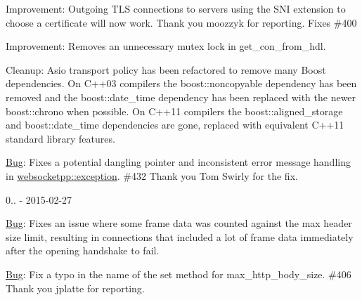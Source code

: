 \begin{DoxyItemize}
\item Improvement\+: Outgoing T\+LS connections to servers using the S\+NI extension to choose a certificate will now work. Thank you moozzyk for reporting. Fixes \#400
\item Improvement\+: Removes an unnecessary mutex lock in {\ttfamily get\+\_\+con\+\_\+from\+\_\+hdl}.
\item Cleanup\+: Asio transport policy has been refactored to remove many Boost dependencies. On C++03 compilers the {\ttfamily boost\+::noncopyable} dependency has been removed and the {\ttfamily boost\+::date\+\_\+time} dependency has been replaced with the newer {\ttfamily boost\+::chrono} when possible. On C++11 compilers the {\ttfamily boost\+::aligned\+\_\+storage} and {\ttfamily boost\+::date\+\_\+time} dependencies are gone, replaced with equivalent C++11 standard library features.
\item \mbox{\hyperlink{struct_bug}{Bug}}\+: Fixes a potential dangling pointer and inconsistent error message handling in {\ttfamily \mbox{\hyperlink{classwebsocketpp_1_1exception}{websocketpp\+::exception}}}. \#432 Thank you Tom Swirly for the fix.
\end{DoxyItemize}

0.. -\/ 2015-\/02-\/27
\begin{DoxyItemize}
\item \mbox{\hyperlink{struct_bug}{Bug}}\+: Fixes an issue where some frame data was counted against the max header size limit, resulting in connections that included a lot of frame data immediately after the opening handshake to fail.
\item \mbox{\hyperlink{struct_bug}{Bug}}\+: Fix a typo in the name of the set method for {\ttfamily max\+\_\+http\+\_\+body\+\_\+size}. \#406 Thank you jplatte for reporting.
\end{DoxyItemize}

